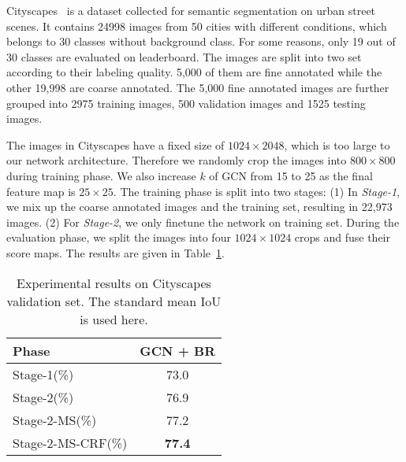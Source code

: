 \documentclass[10pt,twocolumn,letterpaper]{article}
\begin{document}
   Cityscapes~\cite{cordts2016cityscapes} is a dataset collected for semantic segmentation on urban street scenes. It contains 24998 images from 50 cities with different conditions, which belongs to 30 classes without background class. For some reasons, only 19 out of 30 classes are evaluated on leaderboard. The images are split into two set according to their labeling quality. 5,000 of them are fine annotated while the other 19,998 are coarse annotated. The 5,000 fine annotated images are further grouped into 2975 training images, 500 validation images and 1525 testing images. 
\par
   The images in Cityscapes have a fixed size of $1024 \times 2048$, which is too large to our network architecture. Therefore we randomly crop the images into $800 \times 800$ during training phase. We also increase $k$ of GCN from 15 to 25 as the final feature map is $25\times 25$. The training phase is split into two stages: (1) In \emph{Stage-1}, we mix up the coarse annotated images and the training set, resulting in 22,973 images. (2) For \emph{Stage-2}, we only finetune the network on training set. During the evaluation phase, we split the images into four $1024\times 1024$ crops and fuse their score maps. The results are given in Table~\ref{table:cityscapes-train-val}. 
         \begin{table}[h]
      \begin{center}
\begin{tabular}{|l|c|}
            \hline
            Phase & GCN + BR\\
            \hline
            Stage-1(\%) & 73.0\\
            \hline
            Stage-2(\%) & 76.9\\
            \hline
            Stage-2-MS(\%) & 77.2\\
            \hline
            Stage-2-MS-CRF(\%) & \textbf{77.4}\\
            \hline
         \end{tabular}
      \end{center}
      \caption{Experimental results on Cityscapes validation set. The standard mean IoU is used here. }
      \label{table:cityscapes-train-val}
   \end{table}
\end{document}
